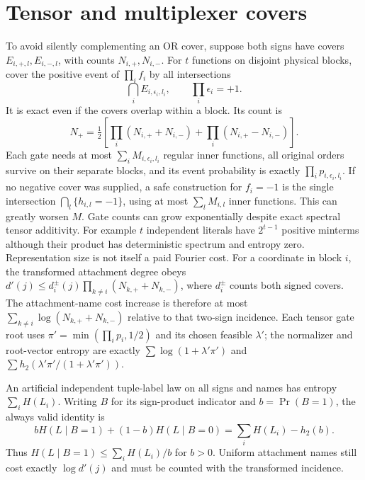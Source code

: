 \documentclass{article}
\begin{document}
\section{Tensor and multiplexer covers}
To avoid silently complementing an OR cover, suppose both signs have
covers $E_{i,+,l},E_{i,-,l}$, with counts $N_{i,+},N_{i,-}$.
For $t$ functions on disjoint physical blocks, cover the positive event
of $\prod_i f_i$ by all intersections
\[
 \bigcap_i E_{i,\epsilon_i,l_i},\qquad\prod_i\epsilon_i=+1.
\]
It is exact even if the covers overlap within a block. Its count is
\[
 N_+=\tfrac12\left[\prod_i(N_{i,+}+N_{i,-})+
                         \prod_i(N_{i,+}-N_{i,-})\right].
\]
Each gate needs at most $\sum_i M_{i,\epsilon_i,l_i}$ regular inner
functions, all original orders survive on their separate blocks, and its
event probability is exactly $\prod_i p_{i,\epsilon_i,l_i}$.
If no negative cover was supplied, a safe construction for $f_i=-1$
is the single intersection $\bigcap_l\{h_{i,l}=-1\}$, using at most
$\sum_l M_{i,l}$ inner functions. This can greatly worsen $M$.
Gate counts can grow exponentially despite exact spectral tensor
additivity. For example $t$ independent literals have $2^{t-1}$ positive
minterms although their product has deterministic spectrum and entropy
zero. Representation size is not itself a paid Fourier cost.
For a coordinate in block $i$, the transformed attachment degree obeys
$d'(j)\le d_i^{\pm}(j)\prod_{k\ne i}(N_{k,+}+N_{k,-})$, where
$d_i^{\pm}$ counts both signed covers. The attachment-name cost increase
is therefore at most $\sum_{k\ne i}\log(N_{k,+}+N_{k,-})$ relative to
that two-sign incidence. Each tensor gate root uses
$\pi'=\min(\prod_i p_i,1/2)$ and its chosen feasible $\lambda'$;
the normalizer and root-vector entropy are exactly
$\sum\log(1+\lambda'\pi')$ and $\sum h_2(\lambda'\pi'/(1+\lambda'\pi'))$.

An artificial independent tuple-label law on all signs and names has
entropy $\sum_i H(L_i)$. Writing $B$ for its sign-product indicator and
$b=\Pr(B=1)$, the always valid identity is
\[
 bH(L\mid B=1)+(1-b)H(L\mid B=0)=\sum_i H(L_i)-h_2(b).
\]
Thus $H(L\mid B=1)\le\sum_iH(L_i)/b$ for $b>0$. Uniform
attachment names still cost exactly $\log d'(j)$ and must be counted
with the transformed incidence.
\end{document}
